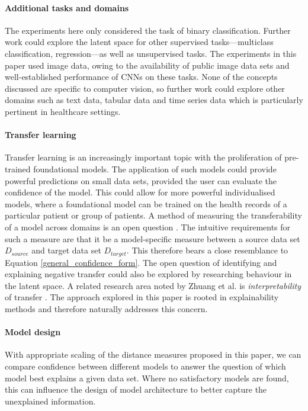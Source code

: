 \documentclass{article}
\begin{document}
\paragraph{Additional tasks and domains}
The experiments here only considered the task of binary classification. Further work could explore the latent space for other supervised tasks---multiclass classification, regression---as well as unsupervised tasks.
The experiments in this paper used image data, owing to the availability of public image data sets and well-established performance of CNNs on these tasks. None of the concepts discussed are specific to computer vision, so further work could explore other domains such as text data, tabular data and time series data which is particularly pertinent in healthcare settings.

\paragraph{Transfer learning} \label{sec:transfer learning}
Transfer learning is an increasingly important topic with the proliferation of pre-trained foundational models.
The application of such models could provide powerful predictions on small data sets, provided the user can evaluate the confidence of the model. This could allow for more powerful individualised models, where a foundational model can be trained on the health records of a particular patient or group of patients.
A method of measuring the transferability of a model across domains is an open question \cite{pan_survey_2010} \cite{zhuang_comprehensive_2021}. The intuitive requirements for such a measure are that it be a model-specific measure between  a source data set $D_{source}$ and target data set $D_{target}$. This therefore bears a close resemblance to Equation \ref{general_confidence_form}.
The open question of identifying and explaining negative transfer could also be explored by researching behaviour in the latent space.
A related research area noted by Zhuang et al. is \emph{interpretability} of transfer \cite{zhuang_comprehensive_2021}. The approach explored in this paper is rooted in explainability methods and therefore naturally addresses this concern.

\paragraph{Model design}
With appropriate scaling of the distance measures proposed in this paper, we can compare confidence between different models to answer the question of which model best explains a given data set. Where no satisfactory models are found, this can influence the design of model architecture to better capture the unexplained information.
\end{document}
